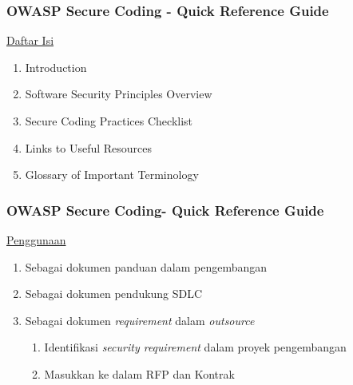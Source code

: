 \documentclass[xcolor=pdftex,table,handouts]{beamer}
\begin{document}
\begin{frame}
	\frametitle{OWASP Secure Coding - Quick Reference Guide}
	\underline{Daftar Isi}
	\begin{enumerate}
		\item Introduction
		\item Software Security Principles Overview
		\item Secure Coding Practices Checklist
		\item Links to Useful Resources
		\item Glossary of Important Terminology
	\end{enumerate}
\end{frame}

\begin{frame}
	\frametitle{OWASP Secure Coding- Quick Reference Guide}
	\underline{Penggunaan}
	\begin{enumerate}
		\item Sebagai dokumen panduan dalam pengembangan
		\item Sebagai dokumen pendukung SDLC
		\item Sebagai dokumen \textit{requirement} dalam \textit{outsource}
		\begin{enumerate}
			\item Identifikasi \textit{security requirement} dalam proyek pengembangan
			\item Masukkan ke dalam RFP dan Kontrak
		\end{enumerate}
	\end{enumerate}
\end{frame}

\end{document}
